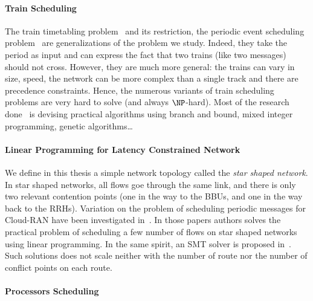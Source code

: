 \paragraph{Train Scheduling}

The train timetabling problem~\cite{lusby2011railway} and its restriction, the periodic event scheduling problem~\cite{serafini1989mathematical} are generalizations of the problem we study. Indeed, they take the period as input and can express the fact that two trains (like two messages) should not cross. However, they are much more general: the trains can vary in size, speed, the network can be more complex than a single track and there are precedence constraints. Hence, the numerous variants of train scheduling problems are very hard to solve (and always $\NP$-hard). Most of the research done~\cite{lusby2011railway} is devising practical algorithms using branch and bound, mixed integer programming, genetic algorithms\dots

\paragraph{Linear Programming for Latency Constrained Network}
We define in this thesis a simple network topology called the {\em star shaped network}. In star shaped networks, all flows goe through the same link, and there is only two relevant contention points (one in the way to the BBUs, and one in the way back to the RRHs).
Variation on the problem of scheduling periodic messages for Cloud-RAN have been investigated in~\cite{nayak2017incremental,steiner2018traffic,silviu2017,naresh2016}. In those papers authors solves the practical problem of scheduling a few number of flows on star shaped networks using linear programming. In the same spirit, an SMT solver is proposed in~\cite{dos2019tsnsched}. Such solutions does not scale neither with the number of route nor the number of conflict points on each route.



\paragraph{Processors Scheduling}



